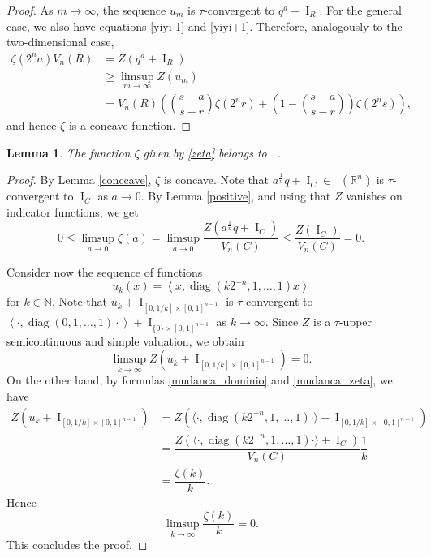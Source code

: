 \documentclass[11pt]{article}
\newtheorem{lema}[teo]{Lemma}
\theoremstyle{definition} %
\newcommand{\RR}{(\mathbb{R}^n)}
\DeclareMathOperator{\I}{I}
\DeclareMathOperator{\diag}{diag}
\DeclareMathOperator{\LP}{Conv_{lp}}
\DeclareMathOperator{\conc}{Conc([0,\infty))}
\begin{document}
\begin{proof}
As $m\rightarrow \infty$, the sequence $u_m$ is $\tau$-convergent to $q^a+\I_R$. For the  general case, we also have  equations \eqref{yiyi-1} and \eqref{yiyi+1}. Therefore, analogously to the two-dimensional case,
\begin{align*}
    \zeta(2^na)V_n(R)&=Z(q^a+\I_R)\\
    & \geq \limsup_{m\rightarrow \infty} Z(u_m)\\
    &=V_n(R)\left(\left(\dfrac{s-a}{s-r}\right) \zeta(2^nr)+ \left(1-\left(\dfrac{s-a}{s-r}\right)\right)\zeta(2^ns)\right),
\end{align*}
and hence $\zeta$ is a concave function.
\end{proof}

\begin{lema}\label{concave1}
The function $\zeta$ given by \eqref{zeta} belongs to $\conc$.
\end{lema}


\begin{proof}
By Lemma \ref{conccave}, $\zeta$ is concave. Note that $a^{\frac{1}{n}}q+\I_{C}\in \LP\RR$ is $\tau$-convergent to  $\I_C$ as $a\rightarrow 0$. By Lemma \ref{positive}, and using that $Z$ vanishes on  indicator functions, we get
$$0\leq \limsup_{a\rightarrow 0}\zeta(a) = \limsup_{a\rightarrow 0} \dfrac{Z(a^{\frac{1}{n}}q+\I_C)}{V_n(C)}\leq \dfrac{Z(\I_C)}{V_n(C)}=0.$$

Consider now the sequence of functions
$$u_k(x)= \left\langle x, \diag(k2^{-n},1, \dots, 1)x\right\rangle $$
for $k\in\mathbb{N}$.  Note that $u_k+\I_{[0,1/k]\times[0,1]^{n-1}} $ is $\tau$-convergent to $\left\langle \cdot, \diag(0,1, \dots, 1)\cdot\right\rangle+\I_{\{0\}\times[0,1]^{n-1}}$ as $k\rightarrow \infty$. Since $Z$ is a $\tau$-upper semicontinuous and simple valuation, we obtain
$$\limsup_{k\rightarrow \infty} Z(u_k+\I_{[0,1/k]\times[0,1]^{n-1}})=0.$$
On the other hand, by formulas  \eqref{mudanca_dominio} and \eqref{mudanca_zeta}, we have
\begin{align*}
    Z(u_k+\I_{[0,1/k]\times[0,1]^{n-1}})&= Z\left(\langle \cdot, \diag(k2^{-n},1, \dots, 1)\cdot\rangle
    +\I_{[0,1/k]\times [0,1]^{n-1}}\right)\\
    &= \dfrac{Z\left(\langle \cdot, \diag(k2^{-n},1, \dots, 1)\cdot\rangle
    +\I_{C}\right)}{V_n(C)}\dfrac{1}{k}\\
    &= \dfrac{\zeta(k)}{k}.
\end{align*}
Hence
$$\limsup_{k\rightarrow \infty} \dfrac{\zeta(k)}{k}=0.$$
This concludes the proof.
\end{proof}
\end{document}
